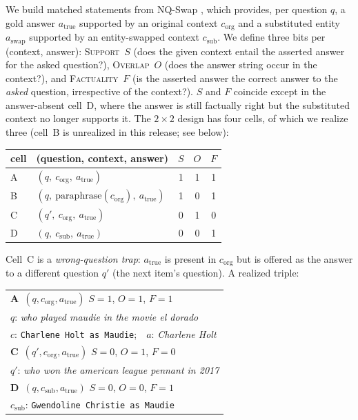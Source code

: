 We build matched statements from NQ-Swap \citep{longpre2021nqswap}, which provides,
per question $q$, a gold answer $a_{\mathrm{true}}$ supported by an original context
$c_{\mathrm{org}}$ and a substituted entity $a_{\mathrm{swap}}$ supported by an
entity-swapped context $c_{\mathrm{sub}}$. We define three bits per (context, answer):
\textsc{Support}~$S$ (does the given context entail the asserted answer for the asked
question?), \textsc{Overlap}~$O$ (does the answer string occur in the context?), and
\textsc{Factuality}~$F$ (is the asserted answer the correct answer to the \emph{asked}
question, irrespective of the context?). $S$ and $F$ coincide except in the
answer-absent cell~D, where the answer is still factually right but the substituted
context no longer supports it.
The $2{\times}2$ design has four cells, of which we realize three (cell~B is
unrealized in this release; see below):
\begin{center}\small
\begin{tabular}{@{}llccc@{}}
\toprule
cell & (question, context, answer) & $S$ & $O$ & $F$ \\
\midrule
A & $(q,\ c_{\mathrm{org}},\ a_{\mathrm{true}})$ & 1 & 1 & 1 \\
B & $(q,\ \mathrm{paraphrase}(c_{\mathrm{org}}),\ a_{\mathrm{true}})$ & 1 & 0 & 1 \\
C & $(q',\ c_{\mathrm{org}},\ a_{\mathrm{true}})$ & 0 & 1 & 0 \\
D & $(q,\ c_{\mathrm{sub}},\ a_{\mathrm{true}})$ & 0 & 0 & 1 \\
\bottomrule
\end{tabular}
\end{center}
Cell~C is a \emph{wrong-question trap}: $a_{\mathrm{true}}$ is present in
$c_{\mathrm{org}}$ but is offered as the answer to a different question $q'$ (the
next item's question). A realized triple:
\begin{center}\small
\begin{tabular}{@{}p{}@{}}
\toprule
\textbf{A}\ $(q, c_{\mathrm{org}}, a_{\mathrm{true}})$ \hfill $S{=}1$, $O{=}1$, $F{=}1$\\
\quad $q$: \emph{who played maudie in the movie el dorado}\\
\quad $c$: \texttt{Charlene Holt as Maudie};\ \ $a$: \emph{Charlene Holt}\\[2pt]
\textbf{C}\ $(q', c_{\mathrm{org}}, a_{\mathrm{true}})$ \hfill $S{=}0$, $O{=}1$, $F{=}0$\\
\quad $q'$: \emph{who won the american league pennant in 2017}\\[2pt]
\textbf{D}\ $(q, c_{\mathrm{sub}}, a_{\mathrm{true}})$ \hfill $S{=}0$, $O{=}0$, $F{=}1$\\
\quad $c_{\mathrm{sub}}$: \texttt{Gwendoline Christie as Maudie}\\
\bottomrule
\end{tabular}
\end{center}
